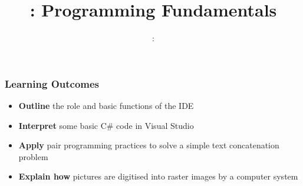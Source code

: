 \usepackage{../../beamerthemeFalmouthGamesAcademy}
\usepackage{multimedia}
\graphicspath{ {../../} }

\usepackage{textcomp}


\usepackage[normalem]{ulem}
\usepackage{wasysym}
\usepackage{pdfpages}

\usetikzlibrary{arrows,automata}





\title{\sessionnumber: Programming Fundamentals}
\subtitle{\modulecode: \moduletitle}

\frame{\titlepage} 

\begin{frame}
	\frametitle{Learning Outcomes}
	\begin{itemize}
		\item \textbf{Outline} the role and basic functions of the IDE
		\item\textbf{Interpret} some basic C\# code in Visual Studio
		\item \textbf{Apply} pair programming practices to solve a simple text concatenation problem
		\item \textbf{Explain how} pictures are digitised into raster images by a computer system
	\end{itemize}
\end{frame}










